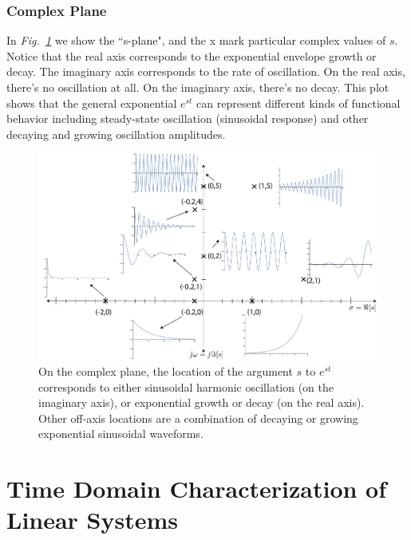 \subsubsection{Complex Plane}
In \emph{Fig.~\ref{fig:splane}} we show the ``s-plane", and the x mark particular complex values of $s$.  Notice that the real axis corresponds to the exponential envelope growth or decay.  The imaginary axis corresponds to the rate of oscillation.  On the real axis, there's no oscillation at all. On the imaginary axis, there's no decay.  This plot shows that the general exponential $e^{st}$ can represent different kinds of functional behavior including steady-state oscillation (sinusoidal response) and other decaying and growing oscillation amplitudes.
\begin{figure}[tb]
\centering
\includegraphics[width=.85\columnwidth]{exp_graph.pdf}
\caption{On the complex plane, the location of the argument $s$ to $e^{st}$ corresponds to either sinusoidal harmonic oscillation (on the imaginary axis), or exponential growth or decay (on the real axis).  Other off-axis locations are a combination of decaying or growing exponential sinusoidal waveforms.}
\label{fig:splane}
\end{figure}
\section{Time Domain Characterization of Linear Systems}
